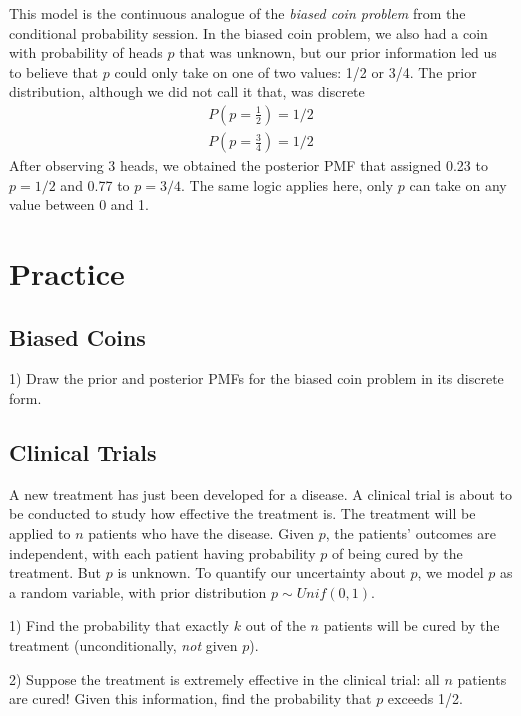 This model is the continuous analogue of the 
\emph{biased coin problem} from the conditional probability session. 
In the biased coin problem, 
we also had a coin with probability of heads \(p\) that was unknown, 
but our prior information led us to believe that \(p\) could only take on one of two values: 1/2 or 3/4. 
The prior distribution, 
although we did not call it that, 
was discrete
\begin{align}P\left( p = \frac{1}{2} \right) = 1/2\end{align}
\begin{align}P\left( p = \frac{3}{4} \right) = 1/2\end{align}
After observing 3 heads, 
we obtained the posterior PMF that assigned 0.23 to \(p = 1/2\) and 0.77 to \(p = 3/4\). 
The same logic applies here, 
only \(p\) can take on any value between 0 and 1.

\section{Practice}

\subsection{Biased Coins}

1) Draw the prior and posterior PMFs for the biased coin problem in its discrete form.

\subsection{Clinical Trials}

A new treatment has just been developed for a disease. 
A clinical trial is about to be conducted to study how effective the treatment is. 
The treatment will be applied to \(n\) patients who have the disease. 
Given \(p\), 
the patients' outcomes are independent, 
with each patient having probability \(p\) of being cured by the treatment. 
But \(p\) is unknown. 
To quantify our uncertainty about \(p\), 
we model \(p\) as a random variable, 
with prior distribution \(p \sim Unif(0,1)\).

1) Find the probability that exactly \(k\) out of the \(n\) patients will be 
cured by the treatment (unconditionally, \emph{not} given \(p\)).

2) Suppose the treatment is extremely effective in the clinical trial: all \(n\) patients are cured! 
Given this information, find the probability that \(p\) exceeds 1/2.


